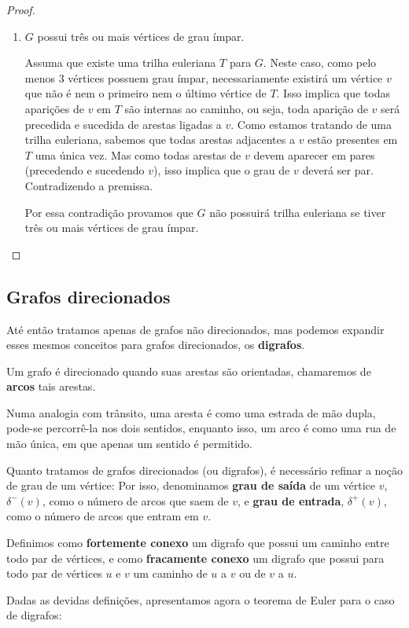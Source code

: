 \begin{proof}
\begin{enumerate}
        \item $G$ possui três ou mais vértices de grau ímpar. 

			Assuma que existe uma trilha euleriana $T$ para $G$. 
			Neste caso, como pelo menos 3 vértices possuem grau ímpar, necessariamente existirá um vértice $v$ que não é nem o primeiro nem o último vértice de $T$.
			Isso implica que todas aparições de $v$ em $T$ são internas ao caminho, ou seja, toda aparição de $v$ será precedida e sucedida de arestas ligadas a $v$.
			Como estamos tratando de uma trilha euleriana, sabemos que todas arestas adjacentes a $v$ estão presentes em $T$ uma única vez. 
			Mas como todas arestas de $v$ devem aparecer em pares (precedendo e sucedendo $v$), isso implica que o grau de $v$ deverá ser par.
			Contradizendo a premissa.

			Por essa contradição provamos que $G$ não possuirá trilha euleriana se tiver três ou mais vértices de grau ímpar.
    \end{enumerate}
\end{proof}

\subsection{Grafos direcionados}

Até então tratamos apenas de grafos não direcionados, mas podemos expandir esses mesmos conceitos para grafos direcionados, os \textbf{digrafos}.

Um grafo é direcionado quando suas arestas são orientadas, chamaremos de \textbf{arcos} tais arestas. 

Numa analogia com trânsito, uma aresta é como uma estrada de mão dupla, pode-se percorrê-la nos dois sentidos, enquanto isso, um arco é como uma rua de mão única, em que apenas um sentido é permitido.

Quanto tratamos de grafos direcionados (ou digrafos), é necessário refinar a noção de grau de um vértice:
Por isso, denominamos \textbf{grau de saída} de um vértice $v$, $\delta^-(v)$, como o número de arcos que saem de $v$, e \textbf{grau de entrada}, $\delta^+(v)$, como o número de arcos que entram em $v$. 

Definimos como \textbf{fortemente conexo} um digrafo que possui um caminho entre todo par de vértices, e como \textbf{fracamente conexo} um digrafo que possui para todo par de vértices $u$ e $v$ um caminho de $u$ a $v$ ou de $v$ a $u$.

Dadas as devidas definições, apresentamos agora o teorema de Euler para o caso de digrafos:

